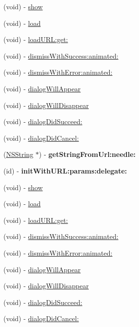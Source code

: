 \begin{DoxyCompactItemize}
\item 
(void) -\/ \hyperlink{interface_f_b_dialog_a657a94d26c8dd3dfbe60b64c6bcbf411}{show}
\item 
(void) -\/ \hyperlink{interface_f_b_dialog_a41ca6458674d1701e6e1d143d5aeb972}{load}
\item 
(void) -\/ \hyperlink{interface_f_b_dialog_a3b32355179377b16579a427e221929f4}{load\-U\-R\-L\-:get\-:}
\item 
(void) -\/ \hyperlink{interface_f_b_dialog_a29fdcc8f0a52e8008b298743d5f7df49}{dismiss\-With\-Success\-:animated\-:}
\item 
(void) -\/ \hyperlink{interface_f_b_dialog_ab28580963cd61978da74492dabce054b}{dismiss\-With\-Error\-:animated\-:}
\item 
(void) -\/ \hyperlink{interface_f_b_dialog_ad0bfcbe959e7334d076079ce3288142d}{dialog\-Will\-Appear}
\item 
(void) -\/ \hyperlink{interface_f_b_dialog_a0aaf0151353b93b543525601f9d41a83}{dialog\-Will\-Disappear}
\item 
(void) -\/ \hyperlink{interface_f_b_dialog_a038587c0962d2dbda704f151d45eb6d3}{dialog\-Did\-Succeed\-:}
\item 
(void) -\/ \hyperlink{interface_f_b_dialog_a91e729bd79578cb130cf5256e1fb2b8e}{dialog\-Did\-Cancel\-:}
\item 
\hypertarget{interface_f_b_dialog_a30c3df8ccf10cc5735d1f7d2e992f984}{
(\hyperlink{class_n_s_string}{\-N\-S\-String} $\ast$) -\/ {\bfseries get\-String\-From\-Url\-:needle\-:}}
\label{interface_f_b_dialog_a30c3df8ccf10cc5735d1f7d2e992f984}

\item 
\hypertarget{interface_f_b_dialog_aaf959b0fcd619b6b05e459983172b10c}{
(id) -\/ {\bfseries init\-With\-U\-R\-L\-:params\-:delegate\-:}}
\label{interface_f_b_dialog_aaf959b0fcd619b6b05e459983172b10c}

\item 
(void) -\/ \hyperlink{interface_f_b_dialog_a657a94d26c8dd3dfbe60b64c6bcbf411}{show}
\item 
(void) -\/ \hyperlink{interface_f_b_dialog_a41ca6458674d1701e6e1d143d5aeb972}{load}
\item 
(void) -\/ \hyperlink{interface_f_b_dialog_a3b32355179377b16579a427e221929f4}{load\-U\-R\-L\-:get\-:}
\item 
(void) -\/ \hyperlink{interface_f_b_dialog_a29fdcc8f0a52e8008b298743d5f7df49}{dismiss\-With\-Success\-:animated\-:}
\item 
(void) -\/ \hyperlink{interface_f_b_dialog_ab28580963cd61978da74492dabce054b}{dismiss\-With\-Error\-:animated\-:}
\item 
(void) -\/ \hyperlink{interface_f_b_dialog_ad0bfcbe959e7334d076079ce3288142d}{dialog\-Will\-Appear}
\item 
(void) -\/ \hyperlink{interface_f_b_dialog_a0aaf0151353b93b543525601f9d41a83}{dialog\-Will\-Disappear}
\item 
(void) -\/ \hyperlink{interface_f_b_dialog_a038587c0962d2dbda704f151d45eb6d3}{dialog\-Did\-Succeed\-:}
\item 
(void) -\/ \hyperlink{interface_f_b_dialog_a91e729bd79578cb130cf5256e1fb2b8e}{dialog\-Did\-Cancel\-:}
\end{DoxyCompactItemize}
